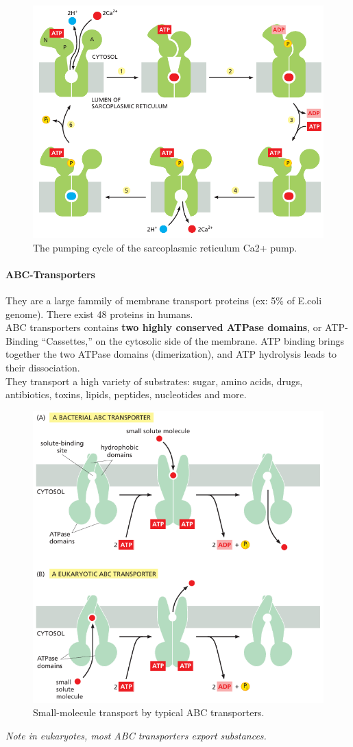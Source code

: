 \documentclass[../main.tex]{subfiles}
\begin{document}
\begin{figure}[H]
	\centering
	\includegraphics[width = 0.7 \textwidth]{17}
	\caption{The pumping cycle of the sarcoplasmic reticulum Ca2+ pump. }
	\label{sarcoplasmic_reticulum_pump}
\end{figure}

\paragraph{ABC-Transporters}
They are a large fammily of membrane transport proteins (ex: 5\% of E.coli genome). There exist 48 proteins in humans. \\
ABC transporters contains \textbf{two highly conserved ATPase domains}, or ATP-Binding “Cassettes,” on the cytosolic side of the membrane. ATP binding brings together the two ATPase domains (dimerization), and ATP hydrolysis leads to their dissociation. \\
They transport a high variety of substrates: sugar, amino acids, drugs, antibiotics, toxins, lipids, peptides, nucleotides and more. 

\begin{figure}[H]
	\centering
	\includegraphics[width = 0.7 \textwidth]{18}
	\caption{Small-molecule transport by typical ABC transporters.}
	\label{ABCtransporter}
\end{figure}
\textit{Note in eukaryotes, most ABC transporters export substances.}
\end{document}
